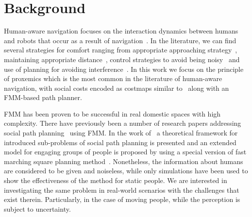 \section{Background}
\label{Literature}


Human-aware navigation focuses on the interaction dynamics between humans and robots that occur as a result of navigation~\cite{Kruse2013}. 
In the literature, we can find several strategies for comfort ranging from appropriate approaching strategy~\cite{Dautenhahn2006}, maintaining appropriate distance~\cite{Takayama2009}, control strategies to avoid being noisy~\cite{Martinson2007} and use of planning for avoiding interference~\cite{Vasquez2012}. In this work we focus on the principle of proxemics which is the most common in the literature of human-aware navigation, with social costs encoded as costmaps similar to~\cite{gomez2013social} along with an FMM-based path planner.



FMM has been proven to be successful in real domestic spaces with high complexity\cite{ventura2015}. There have previously been a number of research papers addressing social path planning~\cite{gomez2014fast,gomez2013social} using FMM. %
In the work of~\cite{gomez2014fast} a theoretical framework for introduced sub-problems of social path planning is presented and an extended model for engaging groups of people is proposed by using a special version of fast marching square planning method~\cite{valero2013fast}. Nonetheless, the information about humans are considered to be given and noiseless, while only simulations have been used to show the effectiveness of the method for static people. We are interested in investigating the same problem in real-world scenarios with the challenges that exist therein. Particularly, in the case of moving people, while the perception is subject to uncertainty. 



